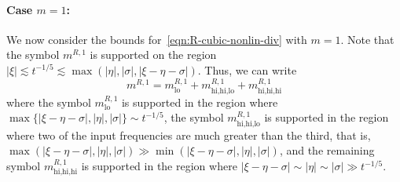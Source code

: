 \documentclass[letterpaper, reqno,final]{amsart}
\begin{document}
\paragraph{\textbf{Case $m=1$}:} We now consider the bounds for~\eqref{eqn:R-cubic-nonlin-div} with $m = 1$.  Note that the symbol $m^{R,1}$ is supported on the region ${|\xi| \lesssim t^{-1/5} \lesssim \max(|\eta|, |\sigma|, |\xi - \eta - \sigma|)}$.  Thus, we can write
\begin{equation}\label{eqn:m-R-1-symbol-decomp}
    m^{R,1} = m^{R,1}_{\text{lo}} + m^{R,1}_{\text{hi,hi,lo}} + m^{R,1}_{\text{hi,hi,hi}}
\end{equation}
where the symbol $m^{R,1}_{\text{lo}}$ is supported in the region where $\max\{|\xi - \eta - \sigma|, |\eta|, |\sigma|\} \sim t^{-1/5}$, the symbol $m^{R,1}_{\text{hi,hi,lo}}$ is supported in the region where two of the input  frequencies are much greater than the third, that is, ${\max (|\xi - \eta - \sigma|, |\eta|, |\sigma|) \gg \min (|\xi - \eta - \sigma|, |\eta|, |\sigma|)}$, and the remaining symbol $m^{R,1}_{\text{hi,hi,hi}}$ is supported in the region where $|\xi-\eta-\sigma| \sim |\eta| \sim |\sigma| \gg t^{-1/5}$.
\end{document}

